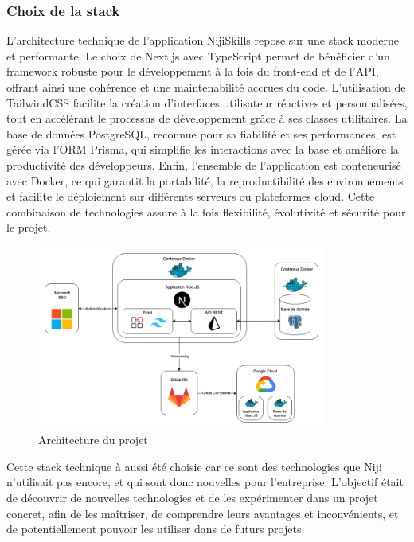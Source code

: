 \documentclass[12pt]{article}
\begin{document}
\subsubsection{Choix de la stack}

L’architecture technique de l’application NijiSkills repose sur une stack moderne et performante. Le choix de Next.js avec TypeScript permet de bénéficier d’un framework robuste pour le développement à la fois du front-end et de l’API, offrant ainsi une cohérence et une maintenabilité accrues du code. L’utilisation de TailwindCSS facilite la création d’interfaces utilisateur réactives et personnalisées, tout en accélérant le processus de développement grâce à ses classes utilitaires. La base de données PostgreSQL, reconnue pour sa fiabilité et ses performances, est gérée via l’ORM Prisma, qui simplifie les interactions avec la base et améliore la productivité des développeurs. Enfin, l’ensemble de l’application est conteneurisé avec Docker, ce qui garantit la portabilité, la reproductibilité des environnements et facilite le déploiement sur différents serveurs ou plateformes cloud. Cette combinaison de technologies assure à la fois flexibilité, évolutivité et sécurité pour le projet.
\begin{figure}[H]
  \centering
  \includegraphics[width=0.85\textwidth]{img/archi.png}
  \caption{Architecture du projet}
\end{figure}
\noindent
Cette stack technique à aussi été choisie car ce sont des technologies que Niji n'utilisait pas encore, et qui sont donc nouvelles pour l'entreprise. L'objectif était de découvrir de nouvelles technologies et de les expérimenter dans un projet concret, afin de les maîtriser, de comprendre leurs avantages et inconvénients, et de potentiellement pouvoir les utiliser dans de futurs projets.
\newpage
\end{document}
